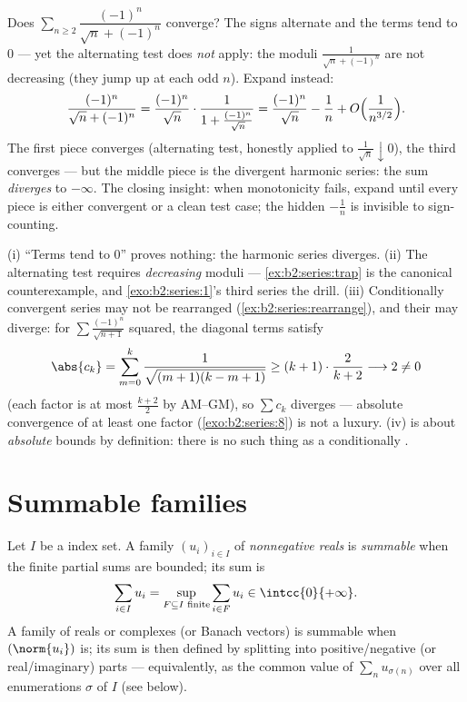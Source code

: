 \begin{example}\label{ex:b2:series:trap}
Does $\sum_{n\geq2} \dfrac{(-1)^n}{\sqrt n + (-1)^n}$ converge?
The signs alternate and the terms tend to $0$ --- yet the
alternating test does \emph{not} apply: the moduli
$\frac{1}{\sqrt n + (-1)^n}$ are not decreasing (they jump up at
each odd $n$). Expand instead:
\[
\frac{(-1)^n}{\sqrt n + (-1)^n}
= \frac{(-1)^n}{\sqrt n}\cdot
\frac{1}{1 + \frac{(-1)^n}{\sqrt n}}
= \frac{(-1)^n}{\sqrt n} - \frac{1}{n}
+ O\Bigl(\frac{1}{n^{3/2}}\Bigr).
\]
The first piece converges (alternating test, honestly applied to
$\frac1{\sqrt n}\downarrow0$), the third converges 
--- but the middle piece is the divergent harmonic series: the
sum \emph{diverges} to $-\infty$. The closing insight: when
monotonicity fails, expand until every piece is either
 convergent or a clean test case; the hidden
$-\frac1n$ is invisible to sign-counting.
\end{example}

\begin{remark}\label{rem:b2:series:pitfalls}
(i) ``Terms tend to $0$'' proves nothing: the harmonic series
diverges. (ii) The alternating test requires \emph{decreasing}
moduli --- \cref{ex:b2:series:trap} is the canonical
counterexample, and \cref{exo:b2:series:1}'s third series the
drill. (iii) Conditionally convergent series may not be
rearranged (\cref{ex:b2:series:rearrange}), and their  may diverge: for $\sum\frac{(-1)^n}{\sqrt{n+1}}$
squared, the diagonal terms satisfy
\[
\abs{c_k} = \sum_{m=0}^{k}
\frac{1}{\sqrt{(m+1)(k-m+1)}}
\geq (k+1)\cdot\frac{2}{k+2} \longrightarrow 2 \neq 0
\]
(each factor is at most $\frac{k+2}2$ by AM--GM), so $\sum c_k$
diverges --- absolute convergence of at least one factor
(\cref{exo:b2:series:8}) is not a luxury. (iv)  is
about \emph{absolute} bounds by definition: there is no such
thing as a conditionally .
\end{remark}

\section{Summable families}

\begin{definition}\label{def:b2:series:summable}
Let $I$ be a  index set. A family $(u_i)_{i \in I}$ of
\emph{nonnegative reals} is \emph{summable}
when the finite partial sums are bounded; its sum is
\[
\sum_{i \in I} u_i = \sup_{F \subseteq I \text{ finite}} \sum_{i
\in F} u_i \in \intcc{0}{+\infty} .
\]
A family of reals or complexes (or Banach vectors) is summable when
$(\norm{u_i})$ is; its sum is then defined by splitting into
positive/negative (or real/imaginary) parts --- equivalently, as the
common value of $\sum_{n} u_{\sigma(n)}$ over all enumerations
$\sigma$ of $I$ (see below).
\end{definition}

